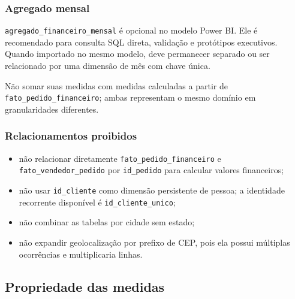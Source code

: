 \documentclass[12pt,a4paper]{article}
\providecommand{\tightlist}{
  \setlength{\itemsep}{0pt}\setlength{\parskip}{0pt}
}
\begin{document}
\subsubsection{Agregado
mensal}\label{docs__analytics__consumo_power_bi_sql.md__agregado-mensal}

\nolinkurl{agregado_financeiro_mensal} é opcional no modelo Power BI.
Ele é recomendado para consulta SQL direta, validação e protótipos
executivos. Quando importado no mesmo modelo, deve permanecer separado
ou ser relacionado por uma dimensão de mês com chave única.

Não somar suas medidas com medidas calculadas a partir de
\nolinkurl{fato_pedido_financeiro}; ambas representam o mesmo domínio em
granularidades diferentes.

\subsubsection{Relacionamentos
proibidos}\label{docs__analytics__consumo_power_bi_sql.md__relacionamentos-proibidos}

\begin{itemize}
\tightlist
\item
  não relacionar diretamente \nolinkurl{fato_pedido_financeiro} e
  \nolinkurl{fato_vendedor_pedido} por \nolinkurl{id_pedido} para
  calcular valores financeiros;
\item
  não usar \nolinkurl{id_cliente} como dimensão persistente de pessoa; a
  identidade recorrente disponível é \nolinkurl{id_cliente_unico};
\item
  não combinar as tabelas por cidade sem estado;
\item
  não expandir geolocalização por prefixo de CEP, pois ela possui
  múltiplas ocorrências e multiplicaria linhas.
\end{itemize}

\subsection{Propriedade das
medidas}\label{docs__analytics__consumo_power_bi_sql.md__propriedade-das-medidas}
\end{document}
